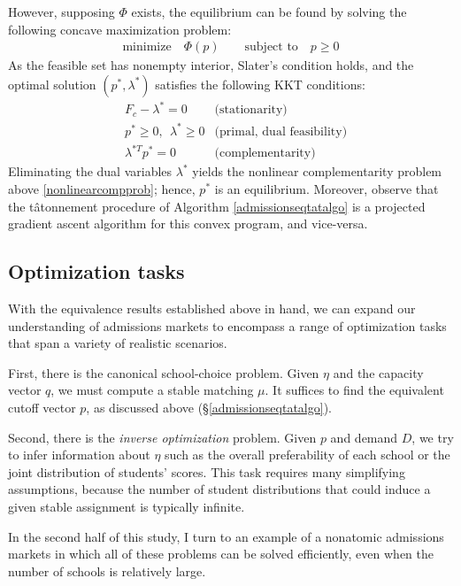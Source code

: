 \documentclass[12pt]{article}
\theoremstyle{definition}
\begin{document}
However, supposing $\Phi$ exists, the equilibrium can be found by solving the following concave maximization problem:
\begin{align*}
\text{minimize} \quad \Phi(p) \qquad \text{subject to} \quad  p \geq 0 
\end{align*}
As the feasible set has nonempty interior, Slater's condition holds, and the optimal solution $(p^*, \lambda^*)$ satisfies the following KKT conditions:
\begin{align*}
&F_c - \lambda^* = 0 & \text{(stationarity)}\\
&p^* \geq 0, ~~ \lambda^* \geq 0  & \text{(primal, dual feasibility)}\\
&\lambda^{*T} p^*=0  & \text{(complementarity)}
\end{align*}
Eliminating the dual variables $\lambda^*$ yields the nonlinear complementarity problem above \eqref{nonlinearcompprob}; hence, $p^*$ is an equilibrium. Moreover, observe that the t\^{a}tonnement procedure of Algorithm \ref{admissionseqtatalgo} is a projected gradient ascent algorithm for this convex program, and vice-versa. 

\subsection{Optimization tasks}
With the equivalence results established above in hand, we can expand our understanding of admissions markets to encompass a range of optimization tasks that span a variety of realistic scenarios.

First, there is the canonical school-choice problem. Given  $\eta$ and the capacity vector $q$, we must compute a stable matching $\mu$. It suffices to find the equivalent cutoff vector $p$, as discussed above (\S\ref{admissionseqtatalgo}).

Second, there is the \emph{inverse optimization} problem. Given $p$ and demand $D$, we try to infer information about $\eta$ such as the overall preferability of each school or the joint distribution of students' scores. This task requires many simplifying assumptions, because the number of student distributions that could induce a given stable assignment is typically infinite. 

In the second half of this study, I turn to an example of a nonatomic admissions markets in which all of these problems can be solved efficiently, even when the number of schools is relatively large. 
\end{document}
